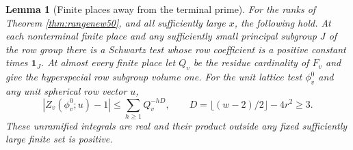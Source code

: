 \documentclass[a4paper,11pt]{article}
\newtheorem{lemma}[proposition]{Lemma}
\theoremstyle{definition}
\theoremstyle{remark}
\numberwithin{equation}{section}
\begin{document}
\begin{lemma}[Finite places away from the terminal prime]
\label{lem:finite167}
For the ranks of Theorem \ref{thm:rangenew50}, and all sufficiently
large \(x\), the following hold.
At each nonterminal finite place and any sufficiently small
principal subgroup \(J\) of the row group there is a Schwartz
test whose row coefficient is a positive constant times
\(\mathbf1_J\). At almost every finite place let \(Q_v\)
be the residue cardinality of \(F_v\) and give the hyperspecial
row subgroup volume one. For the unit lattice test \(\phi_v^0\)
and any unit spherical row vector \(u\),
\[
       |Z_v(\phi_v^0;u)-1|
          \le \sum_{h\ge1} Q_v^{-hD},\qquad
       D=\lfloor(w-2)/2\rfloor-4r^2\ge3 .
\]
These unramified integrals are real and their product outside
any fixed sufficiently large finite set is positive.
\end{lemma}
\end{document}
